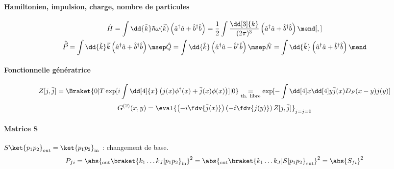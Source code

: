 \documentclass{article}
\begin{document}
\newpage



\paragraph{Hamiltonien, impulsion, charge, nombre de particules}
\begin{gather*}
\hat{H} = \int \dd{\tilde{k}} \hbar\omega(\vec{k})\left(\hat{a}^\dagger\hat{a}+\hat{b}^\dagger\hat{b}\right)
= \frac{1}{2}\int \frac{\dd[3]{k}}{(2\pi)^3} \left(\hat{a}^\dagger\hat{a}+\hat{b}^\dagger\hat{b}\right) \mend[,]\\
\hat{\vec{P}} = \int \dd{\tilde{k}} \vec{k} \left(\hat{a}^\dagger\hat{a}+\hat{b}^\dagger\hat{b}\right) \msep
\hat{Q} = \int \dd{\tilde{k}} \left(\hat{a}^\dagger\hat{a}-\hat{b}^\dagger\hat{b}\right)  \msep
\hat{N} = \int \dd{\tilde{k}} \left(\hat{a}^\dagger\hat{a}+\hat{b}^\dagger\hat{b}\right) \mend
\end{gather*}



\paragraph{Fonctionnelle génératrice}
\begin{align*}
Z[j,\bar{j}] = \Braket{0|T\exp[i\int\dd[4]{x}\left( j(x)\phi^\dagger(x)+\bar{j}(x)\phi(x) \right)]|0}
\underset{\text{th. libre}}{=} \exp[-\int\dd[4]x\dd[4]y\bar{j}(x)D_F(x-y)j(y)]
\end{align*}
\begin{align*}
G^{(2)}(x,y) = \eval{\left(-i\fdv{\bar{j}(x)}\right)\left(-i\fdv{j(y)}\right)  Z[j,\bar{j}]}_{j=\bar{j}=0}
\end{align*}

\paragraph{Matrice S} $S\ket{p_1p_2}_\text{out} = \ket{p_1p_2}_\text{in}$ : changement de base.
\begin{align*}
P_{fi} = \abs{_\text{out}\braket{k_1\dots k_J|p_1p_2}_\text{in}}^2 = \abs{_\text{out}\braket{k_1\dots k_J|S|p_1p_2}_\text{out}}^2
 = \abs{S_{fi}}^2
\end{align*}
\end{document}
